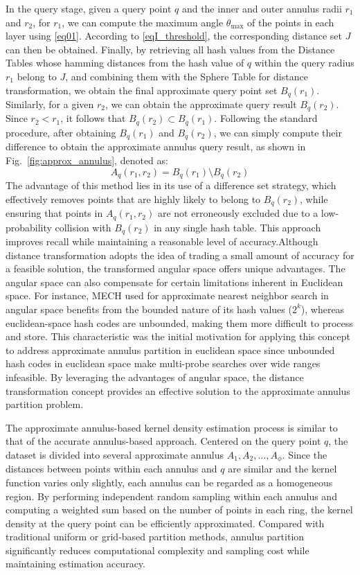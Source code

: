 \documentclass[conference]{IEEEtran}
\begin{document}
In the query stage, given a query point $q$ and the inner and outer annulus radii $r_1$ and $r_2$, for $r_1$, we can compute the maximum angle $\theta_{\max}$ of the points in each layer using \eqref{eq01}. According to \eqref{eqI_threshold}, the corresponding distance set $J$ can then be obtained. Finally, by retrieving all hash values from the Distance Tables whose hamming distances from the hash value of $q$ within the query radius $r_1$ belong to $J$, and combining them with the Sphere Table for distance transformation, we obtain the final approximate query point set $B_q(r_1)$.
Similarly, for a given $r_2$, we can obtain the approximate query result $B_q(r_2)$. Since $r_2 < r_1$, it follows that $B_q(r_2) \subset B_q(r_1)$. Following the standard procedure, after obtaining $B_q(r_1)$ and $B_q(r_2)$, we can simply compute their difference to obtain the approximate annulus query result, as shown in Fig.~\ref{fig:approx_annulus}, denoted as: 
\[
A_q(r_1,r_2) = B_q(r_1) \setminus B_q(r_2)
\]  
The advantage of this method lies in its use of a difference set strategy, which effectively removes points that are highly likely to belong to $B_q(r_2)$, while ensuring that points in $A_q(r_1,r_2)$ are not erroneously excluded due to a low-probability collision with $B_q(r_2)$ in any single hash table. This approach improves recall while maintaining a reasonable level of accuracy.Although distance transformation adopts the idea of trading a small amount of accuracy for a feasible solution, the transformed angular space offers unique advantages. The angular space can also compensate for certain limitations inherent in Euclidean space. For instance, MECH used for approximate nearest neighbor search in angular space benefits from the bounded nature of its hash values ($2^k$), whereas euclidean-space hash codes are unbounded, making them more difficult to process and store. This characteristic was the initial motivation for applying this concept to address approximate annulus partition in euclidean space since unbounded hash codes in euclidean space make multi-probe searches over wide ranges infeasible. By leveraging the advantages of angular space, the distance transformation concept provides an effective solution to the approximate annulus partition problem.


The approximate annulus-based kernel density estimation process is similar to that of the accurate annulus-based approach. Centered on the query point $q$, the dataset is divided into several approximate annulus $A_1, A_2, \ldots, A_\phi$. Since the distances between points within each annulus and $q$ are similar and the kernel function varies only slightly, each annulus can be regarded as a homogeneous region. By performing independent random sampling within each annulus and computing a weighted sum based on the number of points in each ring, the kernel density at the query point can be efficiently approximated. Compared with traditional uniform or grid-based partition methods, annulus partition significantly reduces computational complexity and sampling cost while maintaining estimation accuracy.
\end{document}
